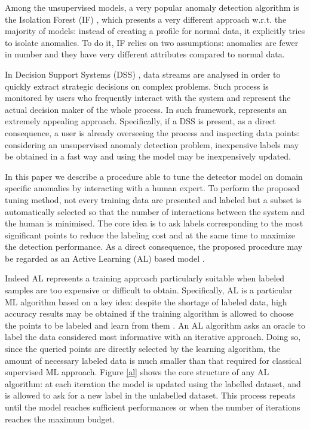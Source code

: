 Among the unsupervised models, a very popular anomaly detection algorithm is the Isolation Forest (IF) \cite{liu2008isolation, liu2012isolation}, which presents a very different approach w.r.t. the majority of models: instead of creating a profile for normal data, it explicitly tries to isolate anomalies. To do it, IF relies on two assumptions: anomalies are fewer in number and they have very different attributes compared to normal data. 



In Decision Support Systems (DSS) \cite{keen1980decision}, data streams are analysed in order to quickly extract strategic decisions on complex problems. Such process is monitored by users who frequently interact with the system and represent the actual decision maker of the whole process. In such framework, \approach represents an extremely appealing approach. Specifically, if a DSS is present, as a direct consequence, a user is already overseeing the process and inspecting data points: considering an unsupervised anomaly detection problem, inexpensive labels may be obtained in a fast way and using \approach the model may be inexpensively updated. 


In this paper we describe a procedure able to tune the detector model on domain specific anomalies by interacting with a human expert. To perform the proposed tuning method, not every training data are presented and labeled but a subset is automatically selected so that the number of interactions between the system and the human is minimised. The core idea is to ask labels corresponding to the most significant points to reduce the labeling cost and at the same time to maximize the detection performance. As a direct consequence, the proposed procedure may be regarded as an Active Learning (AL) based model \cite{kumar2020active}. 



Indeed AL represents a training approach particularly suitable when labeled samples are too expensive or difficult to obtain. Specifically, AL is a particular ML algorithm based on a key idea: despite the shortage of labeled data, high accuracy results may be obtained if the training algorithm is allowed to choose the points to be labeled and learn from them \cite{settles1995active}. An AL algorithm asks an oracle to label the data considered most informative with an iterative approach. Doing so, since the queried points are directly selected by the learning algorithm, the amount of necessary labeled data is much smaller than that required for classical supervised ML approach. Figure \ref{al} shows the core structure of any AL algorithm: at each iteration the model is updated using the labelled dataset, and is allowed to ask for a new label in the unlabelled dataset. This process repeats until the model reaches sufficient performances or when the number of iterations reaches the maximum budget.

